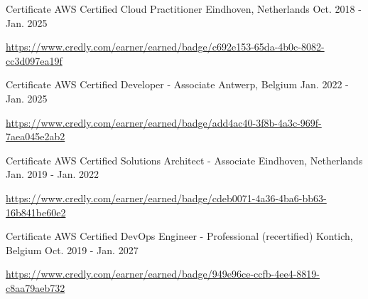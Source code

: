 

\begin{cventries}

  \cventry
    {Certificate} %
    {AWS Certified Cloud Practitioner} %
    {Eindhoven, Netherlands} %
    {Oct. 2018 - Jan. 2025} %
    {
      \begin{cvitems} %
        \item \url{https://www.credly.com/earner/earned/badge/c692e153-65da-4b0c-8082-cc3d097ea19f}
      \end{cvitems}
    }

  \cventry
    {Certificate} %
    {AWS Certified Developer - Associate} %
    {Antwerp, Belgium} %
    {Jan. 2022 - Jan. 2025} %
    {
      \begin{cvitems} %
        \item \url{https://www.credly.com/earner/earned/badge/add4ac40-3f8b-4a3c-969f-7aea045e2ab2}
      \end{cvitems}
    }

  \cventry
    {Certificate} %
    {AWS Certified Solutions Architect - Associate} %
    {Eindhoven, Netherlands} %
    {Jan. 2019 - Jan. 2022} %
    {
      \begin{cvitems} %
        \item \url{https://www.credly.com/earner/earned/badge/cdeb0071-4a36-4ba6-bb63-16b841be60e2}
      \end{cvitems}
    }

  \cventry
    {Certificate} %
    {AWS Certified DevOps Engineer - Professional (recertified)} %
    {Kontich, Belgium} %
    {Oct. 2019 - Jan. 2027} %
    {
      \begin{cvitems} %
        \item \url{https://www.credly.com/earner/earned/badge/949e96ce-ccfb-4ee4-8819-c8aa79aeb732}
      \end{cvitems}
    }


\end{cventries}
